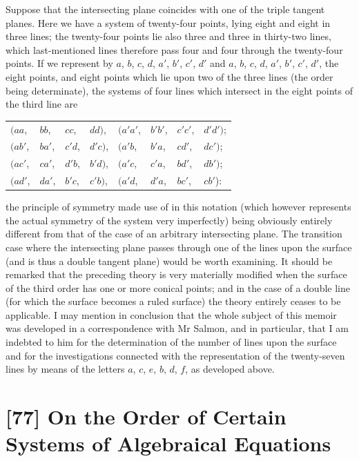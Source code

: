 \documentclass[12pt,a4paper]{article}
\begin{document}
Suppose that the intersecting plane coincides with one of the triple tangent planes. Here we have a system of twenty-four points, lying eight and eight in three lines; the twenty-four points lie also three and three in thirty-two lines, which last-mentioned lines therefore pass four and four through the twenty-four points. If we represent by $a$, $b$, $c$, $d$, $a'$, $b'$, $c'$, $d'$ and $a$, $b$, $c$, $d$, $a'$, $b'$, $c'$, $d'$, the eight points, and eight points which lie upon two of the three lines (the order being determinate), the systems of four lines which intersect in the eight points of the third line are
\begin{center}
\begin{tabular}{llllllll}
$(aa$, & $bb$, & $cc$, & $dd)$, & $(a'a'$, & $b'b'$, & $c'c'$, & $d'd')$; \\
$(ab'$, & $ba'$, & $c'd$, & $d'c)$, & $(a'b$, & $b'a$, & $cd'$, & $dc')$; \\
$(ac'$, & $ca'$, & $d'b$, & $b'd)$, & $(a'c$, & $c'a$, & $bd'$, & $db')$; \\
$(ad'$, & $da'$, & $b'c$, & $c'b)$, & $(a'd$, & $d'a$, & $bc'$, & $cb'$):
\end{tabular}
\end{center}
the principle of symmetry made use of in this notation (which however represents the actual symmetry of the system very imperfectly) being obviously entirely different from that of the case of an arbitrary intersecting plane. The transition case where the intersecting plane passes through one of the lines upon the surface (and is thus a double tangent plane) would be worth examining. It should be remarked that the preceding theory is very materially modified when the surface of the third order has one or more conical points; and in the case of a double line (for which the surface becomes a ruled surface) the theory entirely ceases to be applicable. I may mention in conclusion that the whole subject of this memoir was developed in a correspondence with Mr Salmon, and in particular, that I am indebted to him for the determination of the number of lines upon the surface and for the investigations connected with the representation of the twenty-seven lines by means of the letters $a$, $c$, $e$, $b$, $d$, $f$, as developed above.


\newpage
\section*{[77] On the Order of Certain Systems of Algebraical Equations}
\end{document}
